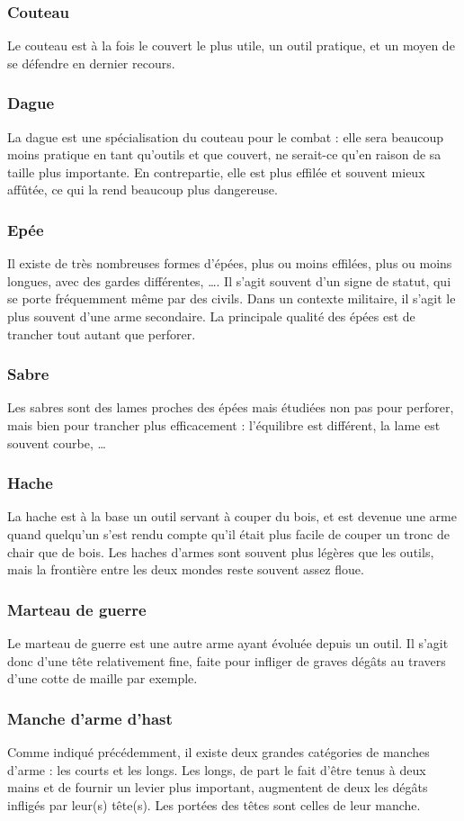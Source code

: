 \documentclass[10pt,a4paper,twocolumn]{book}
\begin{document}
\subsubsection{Couteau}
Le couteau est à la fois le couvert le plus utile, un outil pratique, et un moyen de se défendre en dernier recours.
\subsubsection{Dague}
La dague est une spécialisation du couteau pour le combat : elle sera beaucoup moins pratique en tant qu’outils et que couvert, ne serait-ce qu’en raison de sa taille plus importante. En contrepartie, elle est plus effilée et souvent mieux affûtée, ce qui la rend beaucoup plus dangereuse.
\subsubsection{Epée}
Il existe de très nombreuses formes d’épées, plus ou moins effilées, plus ou moins longues, avec des gardes différentes, …. Il s’agit souvent d’un signe de statut, qui se porte fréquemment même par des civils. Dans un contexte militaire, il s’agit le plus souvent d’une arme secondaire. La principale qualité des épées est de trancher tout autant que perforer.
\subsubsection{Sabre}
Les sabres sont des lames proches des épées mais étudiées non pas pour perforer, mais bien pour trancher plus efficacement : l’équilibre est différent, la lame est souvent courbe, … 
\subsubsection{Hache}
La hache est à la base un outil servant à couper du bois, et est devenue une arme quand quelqu’un s’est rendu compte qu’il était plus facile de couper un tronc de chair que de bois. Les haches d’armes sont souvent plus légères que les outils, mais la frontière entre les deux mondes reste souvent assez floue. 
\subsubsection{Marteau de guerre}
Le marteau de guerre est une autre arme ayant évoluée depuis un outil. Il s’agit donc d’une tête relativement fine, faite pour infliger de graves dégâts au travers d’une cotte de maille par exemple.
\subsubsection{Manche d’arme d’hast}
Comme indiqué précédemment, il existe deux grandes catégories de manches d’arme : les courts et les longs. Les longs, de part le fait d’être tenus à deux mains et de fournir un levier plus important, augmentent de deux les dégâts infligés par leur(s) tête(s). Les portées des têtes sont celles de leur manche.
\end{document}
